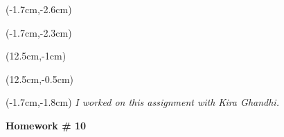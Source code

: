 \documentclass{article}
\begin{document}
\begin{textblock*}{3cm}(-1.7cm,-2.6cm)
\end{textblock*}

\begin{textblock*}{4cm}(-1.7cm,-2.3cm)
\end{textblock*}

\begin{textblock*}{8cm}(12.5cm,-1cm)
\end{textblock*}
\begin{textblock*}{3cm}(12.5cm,-0.5cm)
\end{textblock*}
\begin{textblock*}{13.5cm}(-1.7cm,-1.8cm)
  \noindent \textit{I worked on this assignment with Kira Ghandhi.}
\end{textblock*}

\vspace{1cm}

\begin{center}
  \textbf{\Large Homework \# 10}
\end{center}
\end{document}
